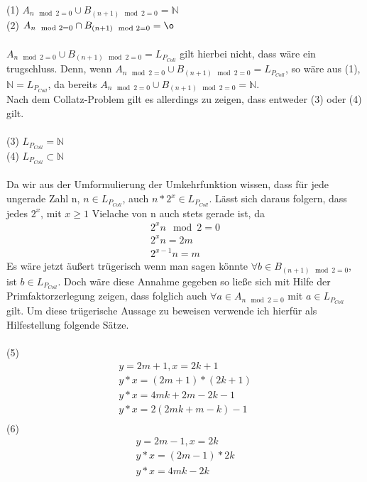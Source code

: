 \documentclass{article}
\begin{document}
\noindent(1) $A_{n \mod 2 = 0} \cup B_{(n + 1) \mod 2 = 0} = \mathbb{N}$ \\
(2) $A_{n \mod 2 = 0} \cap B_{(n + 1) \mod 2 = 0} = \o$ \\\\

\noindent$A_{n \mod 2 = 0} \cup B_{(n + 1) \mod 2 = 0} = L_{P_{Coll}}$ gilt hierbei nicht, dass wäre ein trugschluss. Denn, wenn $A_{n \mod 2 = 0} \cup B_{(n + 1) \mod 2 = 0} = L_{P_{Coll}}$, so wäre aus (1), $\mathbb{N} = L_{P_{Coll}}$, da bereits $A_{n \mod 2 = 0} \cup B_{(n + 1) \mod 2 = 0} = \mathbb{N}$.\\
Nach dem Collatz-Problem gilt es allerdings zu zeigen, dass entweder (3) oder (4) gilt. \\\\
\noindent(3) $L_{P_{Coll}} = \mathbb{N}$\\
(4) $L_{P_{Coll}} \subset \mathbb{N}$ 
\\\\
Da wir aus der Umformulierung der Umkehrfunktion wissen, dass für jede ungerade Zahl n, $n \in L_{P_{Coll}}$, auch $n * 2^{x} \in L_{P_{Coll}}$. Lässt sich daraus folgern, dass jedes $2^{x}$, mit $x \geq 1$ Vielache von n auch stets gerade ist, da
\begin{gather*}
2^{x}n \mod 2 = 0 \\
2^{x}n = 2m \\
2^{x-1}n = m
\end{gather*}
\noindent Es wäre jetzt äußert trügerisch wenn man sagen könnte $\forall b \in B_{(n+1) \mod 2 = 0}$, ist $b \in L_{P_{Coll}}$. Doch wäre diese Annahme gegeben so ließe sich mit Hilfe der Primfaktorzerlegung zeigen, dass folglich auch $\forall a \in A_{n \mod 2 = 0}$ mit $a \in L_{P_{Coll}}$ gilt. Um diese trügerische Aussage zu beweisen verwende ich hierfür als Hilfestellung folgende Sätze.\\\\
\blindtext
\blindtext
(5)
\begin{gather*}
y = 2m+1, x = 2k+1 \\
y * x = (2m+1) * (2k+1) \\
y * x = 4mk + 2m - 2k - 1 \\
y * x = 2(2mk + m - k) -1 \\
\end{gather*}
(6)
\begin{gather*}
y = 2m - 1, x = 2k \\
y * x = (2m - 1) * 2k \\
y * x = 4mk - 2k \\
\end{gather*}
\end{document}
